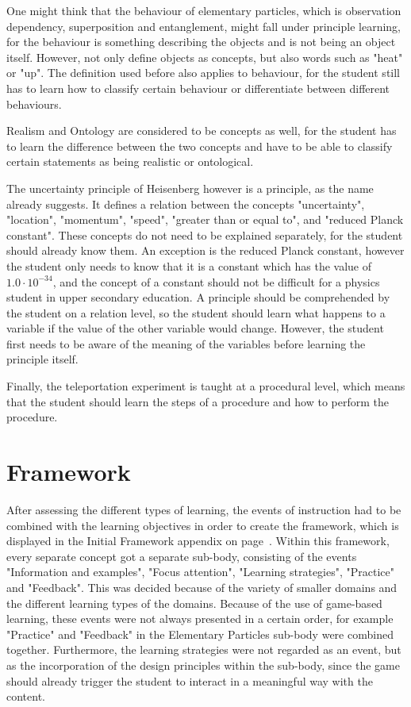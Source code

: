 \documentclass[11pt,twoside]{report} %
\begin{document}
One might think that the behaviour of elementary particles, which is observation dependency, superposition and entanglement, might fall under principle learning, for the behaviour is something describing the objects and is not being an object itself. However,  not only define objects as concepts, but also words such as "heat" or "up". The definition used before also applies to behaviour, for the student still has to learn how to classify certain behaviour or differentiate between different behaviours.

Realism and Ontology are considered to be concepts as well, for the student has to learn the difference between the two concepts and have to be able to classify certain statements as being realistic or ontological.

The uncertainty principle of Heisenberg however is a principle, as the name already suggests. It defines a relation between the concepts "uncertainty", "location", "momentum", "speed", "greater than or equal to", and "reduced Planck constant". These concepts do not need to be explained separately, for the student should already know them. An exception is the reduced Planck constant, however the student only needs to know that it is a constant which has the value of $1.0 \cdot 10^{-34}$, and the concept of a constant should not be difficult for a physics student in upper secondary education. A principle should be comprehended by the student on a relation level, so the student should learn what happens to a variable if the value of the other variable would change. However, the student first needs to be aware of the meaning of the variables before learning the principle itself.

Finally, the teleportation experiment is taught at a procedural level, which means that the student should learn the steps of a procedure and how to perform the procedure.

\section{Framework}

After assessing the different types of learning, the events of instruction had to be combined with the learning objectives in order to create the framework, which is displayed in the Initial Framework appendix on page~\pageref{app:framework1}. Within this framework, every separate concept got a separate sub-body, consisting of the events "Information and examples", "Focus attention", "Learning strategies", "Practice" and "Feedback". This was decided because of the variety of smaller domains and the different learning types of the domains. Because of the use of game-based learning, these events were not always presented in a certain order, for example "Practice" and "Feedback" in the Elementary Particles sub-body were combined together. Furthermore, the learning strategies were not regarded as an event, but as the incorporation of the design principles within the sub-body, since the game should already trigger the student to interact in a meaningful way with the content.
\end{document}
